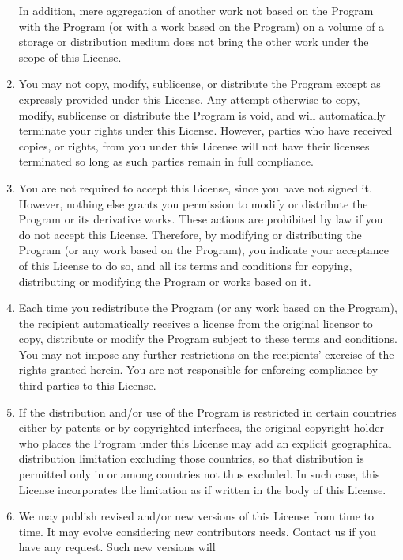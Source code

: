 \begin{enumerate}
    In addition, mere aggregation of another work not based on the Program
    with the Program (or with a work based on the Program) on a volume of
    a storage or distribution medium does not bring the other work under
    the scope of this License.
  \item
    You may not copy, modify, sublicense, or distribute the Program
    except as expressly provided under this License. Any attempt
    otherwise to copy, modify, sublicense or distribute the Program is
    void, and will automatically terminate your rights under this
    License. However, parties who have received copies, or rights,
    from you under this License will not have their licenses
    terminated so long as such parties remain in full compliance.
  \item
    You are not required to accept this License, since you have not
    signed it. However, nothing else grants you permission to modify
    or distribute the Program or its derivative works. These actions
    are prohibited by law if you do not accept this
    License. Therefore, by modifying or distributing the Program (or
    any work based on the Program), you indicate your acceptance of
    this License to do so, and all its terms and conditions for
    copying, distributing or modifying the Program or works based on
    it.
  \item
    Each time you redistribute the Program (or any work based on the
    Program), the recipient automatically receives a license from the
    original licensor to copy, distribute or modify the Program subject
    to these terms and conditions. You may not impose any further
    restrictions on the recipients' exercise of the rights granted
    herein. You are not responsible for enforcing compliance by third
    parties to this License.
  \item
    If the distribution and/or use of the Program is restricted in
    certain countries either by patents or by copyrighted interfaces,
    the original copyright holder who places the Program under this
    License may add an explicit geographical distribution limitation
    excluding those countries, so that distribution is permitted only
    in or among countries not thus excluded. In such case, this License
    incorporates the limitation as if written in the body of this
    License.
  \item
    We may publish revised and/or new versions of this License from
    time to time. It may evolve considering new contributors
    needs. Contact us if you have any request. Such new versions will

\end{enumerate}
